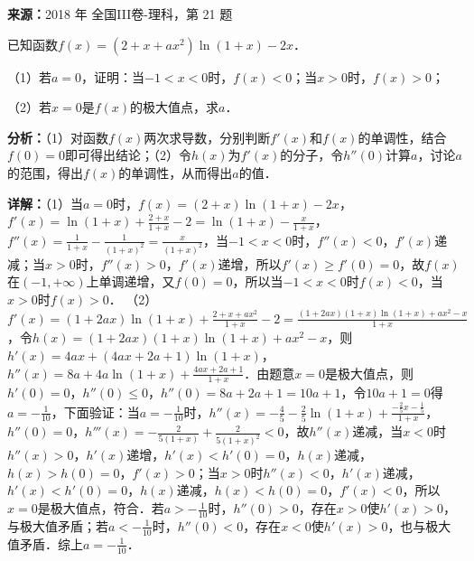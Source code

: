 \begin{question}[points=12]
\textbf{来源：}2018 年 全国III卷-理科，第 21 题\par
已知函数$f(x)=(2+x+ax^2)\ln(1+x)-2x$．

（1）若$a=0$，证明：当$-1<x<0$时，$f(x)<0$；当$x>0$时，$f(x)>0$；

（2）若$x=0$是$f(x)$的极大值点，求$a$．
\begin{solution}

\textbf{分析：}（1）对函数$f(x)$两次求导数，分别判断$f'(x)$和$f(x)$的单调性，结合$f(0)=0$即可得出结论；（2）令$h(x)$为$f'(x)$的分子，令$h''(0)$计算$a$，讨论$a$的范围，得出$f(x)$的单调性，从而得出$a$的值．

\textbf{详解：}（1）当$a=0$时，$f(x)=(2+x)\ln(1+x)-2x$，$f'(x)=\ln(1+x)+\frac{2+x}{1+x}-2=\ln(1+x)-\frac{x}{1+x}$，$f''(x)=\frac{1}{1+x}-\frac{1}{(1+x)^2}=\frac{x}{(1+x)^2}$，当$-1<x<0$时，$f''(x)<0$，$f'(x)$递减；当$x>0$时，$f''(x)>0$，$f'(x)$递增，所以$f'(x)\geq f'(0)=0$，故$f(x)$在$(-1,+\infty)$上单调递增，又$f(0)=0$，所以当$-1<x<0$时$f(x)<0$，当$x>0$时$f(x)>0$．
（2）$f'(x)=(1+2ax)\ln(1+x)+\frac{2+x+ax^2}{1+x}-2=\frac{(1+2ax)(1+x)\ln(1+x)+ax^2-x}{1+x}$，令$h(x)=(1+2ax)(1+x)\ln(1+x)+ax^2-x$，则$h'(x)=4ax+(4ax+2a+1)\ln(1+x)$，$h''(x)=8a+4a\ln(1+x)+\frac{4ax+2a+1}{1+x}$．由题意$x=0$是极大值点，则$h'(0)=0$，$h''(0)\leq0$，$h''(0)=8a+2a+1=10a+1$，令$10a+1=0$得$a=-\frac{1}{10}$，下面验证：当$a=-\frac{1}{10}$时，$h''(x)=-\frac{4}{5}-\frac{2}{5}\ln(1+x)+\frac{-\frac{2}{5}x-\frac{1}{5}}{1+x}$，$h''(0)=0$，$h'''(x)=-\frac{2}{5(1+x)}+\frac{2}{5(1+x)^2}<0$，故$h''(x)$递减，当$x<0$时$h''(x)>0$，$h'(x)$递增，$h'(x)<h'(0)=0$，$h(x)$递减，$h(x)>h(0)=0$，$f'(x)>0$；当$x>0$时$h''(x)<0$，$h'(x)$递减，$h'(x)<h'(0)=0$，$h(x)$递减，$h(x)<h(0)=0$，$f'(x)<0$，所以$x=0$是极大值点，符合．若$a>-\frac{1}{10}$时，$h''(0)>0$，存在$x>0$使$h'(x)>0$，与极大值矛盾；若$a<-\frac{1}{10}$时，$h''(0)<0$，存在$x<0$使$h'(x)>0$，也与极大值矛盾．综上$a=-\frac{1}{10}$．
\end{solution}
\end{question}

